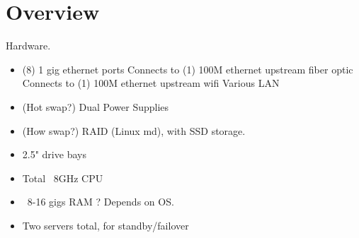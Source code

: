 %
%
%
%
%

\section{Overview}
Hardware.

\begin{itemize}
 \item (8) 1 gig ethernet ports
  Connects to (1) 100M ethernet upstream fiber optic
  Connects to (1) 100M ethernet upstream wifi
  Various LAN
 \item (Hot swap?) Dual Power Supplies
 \item (How swap?) RAID (Linux md), with SSD storage.
 \item 2.5" drive bays
 \item Total ~8GHz CPU
 \item ~8-16 gigs RAM ? Depends on OS.
 \item Two servers total, for standby/failover
\end{itemize}

